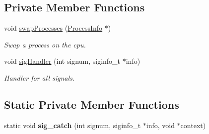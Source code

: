 \subsection*{\-Private \-Member \-Functions}
\begin{DoxyCompactItemize}
\item 
void \hyperlink{classcKernel_a1a0cb2a56afb1e4adfd3bb05156aec81}{swap\-Processes} (\hyperlink{structProcessInfo}{\-Process\-Info} $\ast$)
\begin{DoxyCompactList}\small\item\em \-Swap a process on the cpu. \end{DoxyCompactList}\item 
void \hyperlink{classcKernel_a60ccaffeee3cfcfdfb4aa7b9e33b19f4}{sig\-Handler} (int signum, siginfo\-\_\-t $\ast$info)
\begin{DoxyCompactList}\small\item\em \-Handler for all signals. \end{DoxyCompactList}\end{DoxyCompactItemize}
\subsection*{\-Static \-Private \-Member \-Functions}
\begin{DoxyCompactItemize}
\item 
\hypertarget{classcKernel_a09997c6f9e9c6d7059b4a2292c3b7b09}{static void {\bfseries sig\-\_\-catch} (int signum, siginfo\-\_\-t $\ast$info, void $\ast$context)}\label{db/da5/classcKernel_a09997c6f9e9c6d7059b4a2292c3b7b09}

\end{DoxyCompactItemize}

